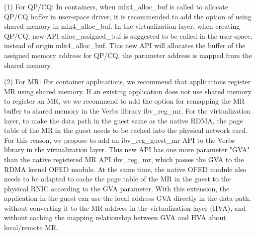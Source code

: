 (1) For QP/CQ: In containers, when mlx4\_alloc\_buf is called to allocate QP/CQ buffer in user-space driver, it is recommended to add the option of using shared memory in mlx4\_alloc\_buf. In the virtualization layer, when creating QP/CQ, new API alloc\_assigned\_buf is suggested to be called in the user-space, instead of origin  mlx4\_alloc\_buf. This new API will allocates the buffer of the assigned memory address for QP/CQ, the parameter address is mapped from the shared memory.


(2) For MR: For container applications, we recommend that applications register MR using shared memory. If an existing application does not use shared memory to register an MR, we  we recommend to add the option for remapping the MR buffer to shared memory in the Verbs library ibv\_reg\_mr. For the virtualization layer, to make the data path in the guest same as the native RDMA, the page table of the MR in the guest needs to be cached into the physical network card. For this reason, we propose to add an ibv\_reg\_guest\_mr API to the Verbs library in the virtualization layer. This new API has one more parameter "GVA" than the native registered MR API ibv\_reg\_mr, which passes the GVA to the RDMA kernel OFED module. At the same time, the native OFED module also needs to be adapted to cache the page table of the MR in the guest to the physical RNIC according to the GVA parameter. With this extension, the application in the guest can use the local address GVA directly in the data path, without converting it to the MR address in the virtualization layer (HVA), and without caching the mapping relationship between GVA and HVA about local/remote MR.